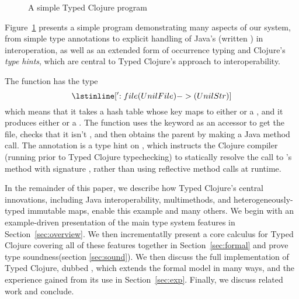 \begin{figure}
\inputminted[firstline=5,lastline=7]{clojure}{code/demo/src/demo/parent2.clj}
\caption{A simple Typed Clojure program}
\label{fig:ex1}
\end{figure}

Figure~\ref{fig:ex1} presents a simple program demonstrating many
aspects of our system, from simple type annotations to explicit
handling of Java's  (written ) in interoperation, as well as an
extended form of occurrence typing and Clojure's \emph{type hints},
which are central to Typed Clojure's approach to interoperability. 

The  function has the type 
$$
\clj{['{:file (U nil File)} -> (U nil Str)]}
$$
which means that it takes a hash table whose  key maps to either
 or a , and it produces either  or a
. The  function uses the  keyword
as an accessor to get the file, checks that it isn't , and
then obtains the parent by making a Java method call.
%
The annotation  is a type hint on , which instructs the Clojure
compiler (running prior to Typed Clojure typechecking) to statically
resolve the  
call to 's  method with signature , rather than using reflective method calls at runtime.

In the remainder of this paper, we describe how Typed Clojure's
central innovations, including Java interoperability, multimethods,
and heterogeneously-typed immutable maps, enable this example and many
others. We begin with an example-driven presentation of the main type
system features in Section~\ref{sec:overview}. We then incrementatlly
present a core calculus for Typed Clojure covering all of these
features together in Section~\ref{sec:formal} and prove type
soundness(section \ref{sec:sound}). We then discuss the full
implementation of Typed Clojure, dubbed \coretyped{}, which extends
the formal model in many ways, and the experience gained from its use
in Section~\ref{sec:exp}. Finally, we discuss related work and
conclude.


